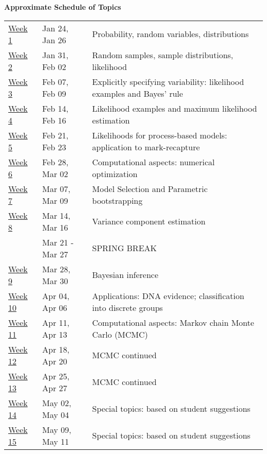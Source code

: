 \documentclass[11pt]{article}
\begin{document}
{\bf Approximate Schedule of Topics}\\
\begin{table}[htdp]
\begin{center}
\begin{tabular}{|ll|p{4in}|}
\hline
\underline{Week 1} &  Jan 24, Jan 26 & Probability, random variables, distributions  \\
\underline{Week 2} &  Jan 31, Feb 02 & Random samples, sample distributions, likelihood  \\
\underline{Week 3} &  Feb 07, Feb 09 & Explicitly specifying variability:  likelihood examples and Bayes' rule \\
\underline{Week 4} &  Feb 14, Feb 16 & Likelihood examples and maximum likelihood estimation \\
\underline{Week 5} &  Feb 21, Feb 23 & Likelihoods for process-based models: application to mark-recapture \\
\underline{Week 6} &  Feb 28, Mar 02 & Computational aspects: numerical optimization\\
\underline{Week 7} &  Mar 07, Mar 09 & Model Selection and Parametric bootstrapping\\
\underline{Week 8} &  Mar 14, Mar 16 & Variance component estimation \\
& Mar 21 - Mar 27 & SPRING BREAK \\
\underline{Week 9} &  Mar 28, Mar 30  & Bayesian inference\\
\underline{Week 10} & Apr 04, Apr 06 &   Applications:  DNA evidence; classification into discrete groups    \\
\underline{Week 11} & Apr 11, Apr 13  &  Computational  aspects: Markov chain Monte Carlo (MCMC)\\
\underline{Week 12} & Apr 18, Apr 20  &  MCMC continued \\
\underline{Week 13} & Apr 25, Apr 27  &   MCMC continued \\
\underline{Week 14} & May 02, May 04  &  Special topics: based on student suggestions\\
\underline{Week 15} & May 09, May 11  &  Special topics: based on student suggestions \\
\hline
\end{tabular}
\end{center}
\label{default}
\end{table}%
\end{document}
